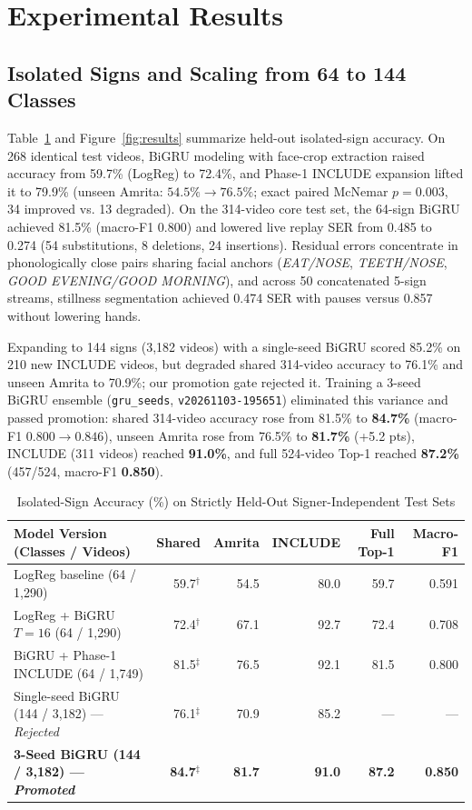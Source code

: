 \documentclass[a4paper,12pt]{article}
\begin{document}
\section{Experimental Results}
\subsection{Isolated Signs and Scaling from 64 to 144 Classes}
Table~\ref{tab:isolated} and Figure~\ref{fig:results} summarize held-out isolated-sign accuracy. On 268 identical test videos, BiGRU modeling with face-crop extraction raised accuracy from 59.7\% (LogReg) to 72.4\%, and Phase-1 INCLUDE expansion lifted it to 79.9\% (unseen Amrita: $54.5\% \rightarrow 76.5\%$; exact paired McNemar $p = 0.003$, 34 improved vs. 13 degraded). On the 314-video core test set, the 64-sign BiGRU achieved 81.5\% (macro-F1 0.800) and lowered live replay SER from 0.485 to 0.274 (54 substitutions, 8 deletions, 24 insertions). Residual errors concentrate in phonologically close pairs sharing facial anchors (\textit{EAT/NOSE}, \textit{TEETH/NOSE}, \textit{GOOD EVENING/GOOD MORNING}), and across 50 concatenated 5-sign streams, stillness segmentation achieved 0.474 SER with pauses versus 0.857 without lowering hands.

Expanding to 144 signs (3,182 videos) with a single-seed BiGRU scored 85.2\% on 210 new INCLUDE videos, but degraded shared 314-video accuracy to 76.1\% and unseen Amrita to 70.9\%; our promotion gate rejected it. Training a 3-seed BiGRU ensemble (\texttt{gru\_seeds}, \texttt{v20261103-195651}) eliminated this variance and passed promotion: shared 314-video accuracy rose from 81.5\% to \textbf{84.7\%} (macro-F1 $0.800 \rightarrow 0.846$), unseen Amrita rose from 76.5\% to \textbf{81.7\%} (+5.2 pts), INCLUDE (311 videos) reached \textbf{91.0\%}, and full 524-video Top-1 reached \textbf{87.2\%} (457/524, macro-F1 \textbf{0.850}).

\begin{table}[h!]
\centering
\caption{Isolated-Sign Accuracy (\%) on Strictly Held-Out Signer-Independent Test Sets}
\label{tab:isolated}
\small
\begin{tabular}{lrrrrr}
\toprule
\textbf{Model Version (Classes / Videos)} & \textbf{Shared} & \textbf{Amrita} & \textbf{INCLUDE} & \textbf{Full Top-1} & \textbf{Macro-F1} \\
\midrule
LogReg baseline (64 / 1,290) & 59.7$^\dagger$ & 54.5 & 80.0 & 59.7 & 0.591 \\
LogReg + BiGRU $T{=}16$ (64 / 1,290) & 72.4$^\dagger$ & 67.1 & 92.7 & 72.4 & 0.708 \\
BiGRU + Phase-1 INCLUDE (64 / 1,749) & 81.5$^\ddagger$ & 76.5 & 92.1 & 81.5 & 0.800 \\
Single-seed BiGRU (144 / 3,182) --- \textit{Rejected} & 76.1$^\ddagger$ & 70.9 & 85.2 & --- & --- \\
\midrule
\textbf{3-Seed BiGRU (144 / 3,182) --- \textit{Promoted}} & \textbf{84.7}$^\ddagger$ & \textbf{81.7} & \textbf{91.0} & \textbf{87.2} & \textbf{0.850} \\
\bottomrule
\end{tabular}
\end{table}
\end{document}
